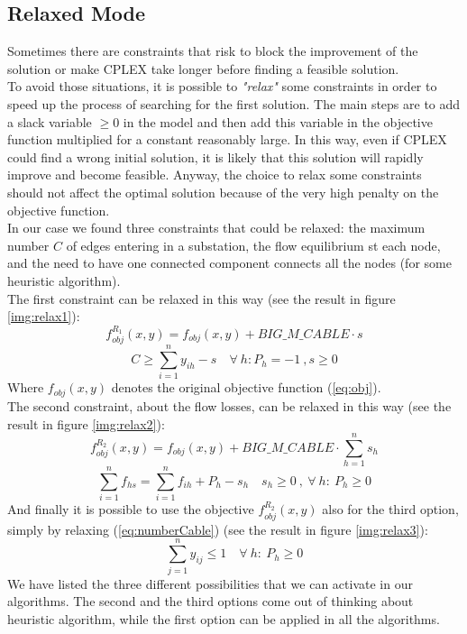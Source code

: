 \subsection{Relaxed Mode}
Sometimes there are constraints that risk to block the improvement of the solution or make \textsc{CPLEX} take longer before finding a feasible solution. \\
To avoid those situations, it is possible to \textit{"relax"} some constraints in order to speed up the process of searching for the first solution. The main steps are to add a slack variable $\geq 0$ in the model and then add this variable in the objective function multiplied for a constant reasonably large. In this way, even if \textsc{CPLEX} could find a wrong initial solution, it is likely that this solution will rapidly improve and become feasible. Anyway, the choice to relax some constraints should not affect the optimal solution because of the very high penalty on the objective function. \\
In our case we found three constraints that could be relaxed: the maximum number $C$ of edges entering in a substation, the flow equilibrium st each node, and the need to have one connected component connects all the nodes (for some heuristic algorithm). \\
The first constraint can be relaxed in this way (see the result in figure \ref{img:relax1}):
\[
f^{R_1}_{obj} (x,y) = f_{obj} (x,y) + BIG\_M\_CABLE \cdot s
\]
\[
C \geq \sum^n_{i=1} y_{ih} -s \quad \forall \ h : P_h = -1 \ , s \geq 0
\] Where $f_{obj} (x,y)$ denotes the original objective function (\ref{eq:obj}).\\
The second constraint, about the flow losses, can be relaxed in this way (see the result in figure \ref{img:relax2}):
\[
f^{R_2}_{obj} (x,y) = f_{obj} (x,y) + BIG\_M\_CABLE \cdot \sum^n_{h=1} s_h
\]
\[
\sum^n_{i=1} f_{hs} = \sum^n_{i=1} f_{ih} + P_h - s_h \quad s_h \geq 0 \ , \ \forall \ h : \  P_h \geq 0
\]
And finally it is possible to use the objective $f^{R_2}_{obj} (x,y)$ also for the third option, simply by relaxing (\ref{eq:numberCable}) (see the result in figure \ref{img:relax3}): 
\[
\sum^n_{j=1} y_{ij} \leq 1 \quad \forall \ h : \  P_h \geq 0
\]
We have listed the three different possibilities that we can activate in our algorithms. The second and the third options come out of thinking about heuristic algorithm, while the first option can be applied in all the algorithms. 
